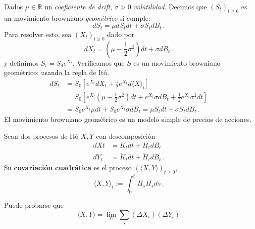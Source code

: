 \begin{example}
Dados $\mu \in \mathbb{R}$ un \textit{coeficiente de drift}, $\sigma > 0$  \textit{volatilidad}. Decimos que $(S_t)_{t \ge 0}$ es un movimiento browniano \textit{geométrico} si cumple: 
\begin{equation*}
    \label{eq:ito_cal_ej}
    dS_t = \mu dS_t dt + \sigma S_t dB_t\,.
\end{equation*}
Para resolver esto, sea $(X_t)_{t \ge 0}$ dado por 
\begin{equation*}
        dX_t = (\mu - \frac{1}{2} \sigma^2) dt + \sigma d B_t\,.
\end{equation*}
y definimos $S_t = S_0 e^{X_t}$. Verificamos que $S$ es un movimiento browniano geométrico: usando la regla de It\^{o}, 
\begin{align*}
    dS_t &= S_0 \left[e^{X_t} dX_t + \frac{1}{2} e^{X_t} d \langle X  \rangle_t \right] \\
    &= S_0 \left[e^{X_t} (\mu - \frac{1}{2} \sigma^2)dt + e^{X_t} \sigma dB_t + \frac{1}{2} e^{X_t} \sigma^2 dt    \right] \\
    &= S_0 e^{X_t} \mu dt + S_0 e^{X_t} \sigma dB_t = \mu S_t dt + \sigma S_t dB_t\,.
\end{align*}
El movimiento browniano geométrico es un modelo simple de precios de acciones.
\end{example}

\begin{definition}
\label{def:cov_cuad}
Sean dos procesos de It\^{o} $X,Y$ con descomposición
\begin{align*}
    \label{eq:ito_cal_4}
    dXt &= K_t dt + H_t dB_t \\ 
    dY_t&= \tilde{K} _t dt + \tilde{H}_t dB_t \,.
\end{align*}
Su \textbf{covariación cuadrática} es el proceso $(\langle X,Y \rangle)_{t \ge  0}$, 
\begin{equation*}
    \langle X,Y \rangle_t := \int_{0}^{t} H_s \tilde{H} _s  ds\,.
\end{equation*}
\end{definition}

\begin{remark}
Puede probarse que 
\begin{equation*}
    \langle X,Y \rangle = \lim_{n} \sum_{i} (\Delta X_i)(\Delta Y_i) 
\end{equation*}
\end{remark}

